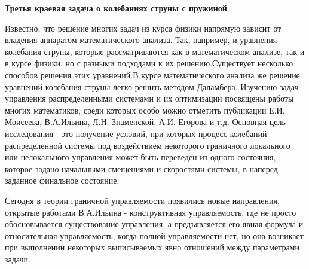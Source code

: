 \begin{center}
\textbf{Третья краевая задача о колебаниях струны с пружиной}
\end{center}


Известно, что решение многих задач из курса физики напрямую зависит от владения аппаратом математического анализа. Так, например, и уравнения колебания струны, которые рассматриваются как в математическом анализе, так и в курсе физики, но с разными подходами к их решению.Существует несколько способов решения этих уравнений.В курсе математического анализа же решение уравнений колебания струны легко решить методом Даламбера. Изучению задач управления распределенными системами и их оптимизации посвящены работы многих математиков, среди которых особо можно отметить публикации Е.И. Моисеева, В.А.Ильина, Л.Н. Знаменской, А.И. Егорова и т.д. Основная цель исследования - это получение условий, при которых процесс колебаний распределенной системы под воздействием некоторого граничного локального или нелокального управления может быть переведен из одного состояния, которое задано начальными смещениями и скоростями системы, в наперед заданное финальное состояние.

Сегодня в теории граничной управляемости появились новые направления, открытые работами В.А.Ильина - конструктивная управляемость, где не просто обосновывается существование управления, а предъявляется его явная формула и относительная управляемость, когда полной управляемости нет, но она возникает при выполнении некоторых выписываемых явно отношений между параметрами задачи.
